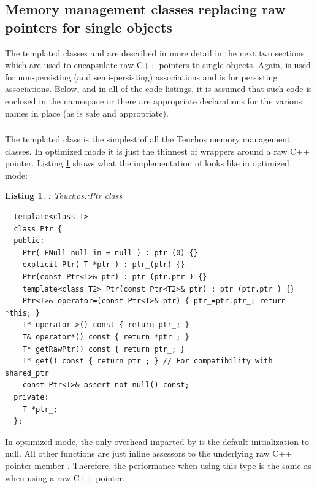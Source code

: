 \documentclass[pdf,ps2pdf,11pt]{SANDreport}
\newtheorem{listing}{Listing}
\begin{document}


%
{}\subsection{Memory management classes replacing raw pointers for
single objects}
\label{sec:mem-mng-classes-single-objs}
%

The templated classes {} and {} are described in more detail
in the next two sections which are used to encapsulate raw C++ pointers to
single objects.  Again, {} is used for non-persisting (and
semi-persisting) associations and {} is for persisting associations.
Below, and in all of the code listings, it is assumed that such code is
enclosed in the {} namespace or there are appropriate
{} declarations for the various names in place (as is
safe and appropriate).

%
{}\subsubsection{}
\label{sec:Ptr}
%

The templated class {} is the simplest of all the Teuchos
memory management classes.  In optimized mode it is just the thinnest
of wrappers around a raw C++ pointer.  Listing {}\ref{listing:Ptr}
shows what the implementation of {} looks like in
optimized mode:

\begin{listing}: Teuchos::Ptr class\\
\label{listing:Ptr}
{\small\begin{verbatim}
  template<class T>
  class Ptr {
  public:
    Ptr( ENull null_in = null ) : ptr_(0) {}
    explicit Ptr( T *ptr ) : ptr_(ptr) {}
    Ptr(const Ptr<T>& ptr) : ptr_(ptr.ptr_) {}
    template<class T2> Ptr(const Ptr<T2>& ptr) : ptr_(ptr.ptr_) {}
    Ptr<T>& operator=(const Ptr<T>& ptr) { ptr_=ptr.ptr_; return *this; }
    T* operator->() const { return ptr_; }
    T& operator*() const { return *ptr_; }
    T* getRawPtr() const { return ptr_; }
    T* get() const { return ptr_; } // For compatibility with shared_ptr
    const Ptr<T>& assert_not_null() const;
  private:
    T *ptr_;
  };
\end{verbatim}}
\end{listing}

In optimized mode, the only overhead imparted by {} is the
default initialization to null.  All other functions are just inline
assessors to the underlying raw C++ pointer member {}.
Therefore, the performance when using this type is the same as when
using a raw C++ pointer.
\end{document}
